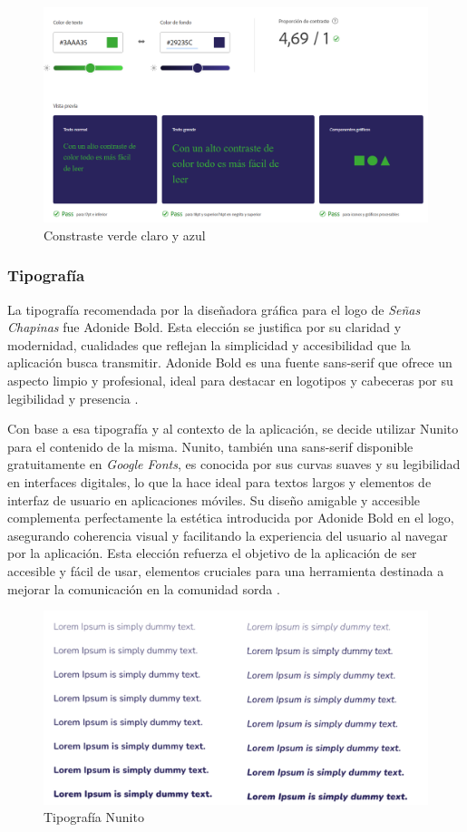 \begin{itemize}
    \begin{figure} [H]
        \centering
        \includegraphics[width=0.6\linewidth]{figuras/contraste_verde_claro_azul.png}
        \caption{Constraste verde claro y azul}
        \label{fig:enter-label}
    \end{figure}
        

\end{itemize}



\subsubsection{Tipografía}

La tipografía recomendada por la diseñadora gráfica para el logo de \textit{Señas Chapinas} fue Adonide Bold. Esta elección se justifica por su claridad y modernidad, cualidades que reflejan la simplicidad y accesibilidad que la aplicación busca transmitir. Adonide Bold es una fuente sans-serif que ofrece un aspecto limpio y profesional, ideal para destacar en logotipos y cabeceras por su legibilidad y presencia  \cite{AdonideFont}.

Con base a esa tipografía y al contexto de la aplicación, se decide utilizar Nunito para el contenido de la misma. Nunito, también una sans-serif disponible gratuitamente en \textit{Google Fonts}, es conocida por sus curvas suaves y su legibilidad en interfaces digitales, lo que la hace ideal para textos largos y elementos de interfaz de usuario en aplicaciones móviles. Su diseño amigable y accesible complementa perfectamente la estética introducida por Adonide Bold en el logo, asegurando coherencia visual y facilitando la experiencia del usuario al navegar por la aplicación. Esta elección refuerza el objetivo de la aplicación de ser accesible y fácil de usar, elementos cruciales para una herramienta destinada a mejorar la comunicación en la comunidad sorda \cite{Design2024}.

\begin{figure} [H]
    \centering
    \includegraphics[width=0.75\linewidth]{figuras/tipografia.png}
    \caption{Tipografía Nunito}
    \label{fig:enter-label}
\end{figure}

